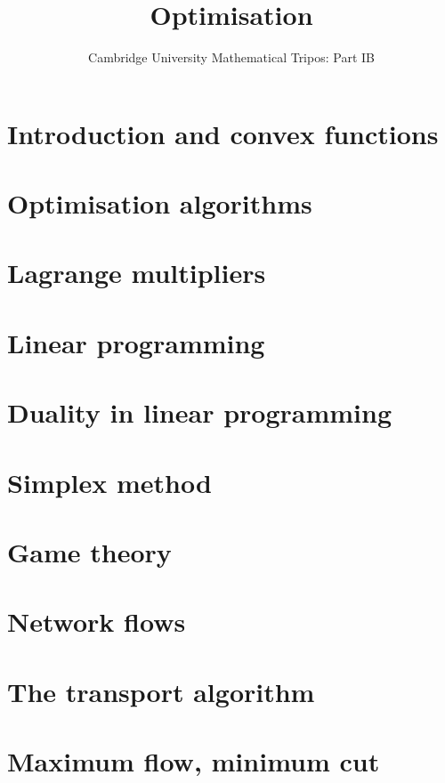 \documentclass{article}
\title{Optimisation}
\author{Cambridge University Mathematical Tripos: Part IB}
\begin{document}
\maketitle

\tableofcontentsnewpage{}

\section{Introduction and convex functions}

\section{Optimisation algorithms}

\section{Lagrange multipliers}

\section{Linear programming}

\section{Duality in linear programming}

\section{Simplex method}

\section{Game theory}

\section{Network flows}

\section{The transport algorithm}

\section{Maximum flow, minimum cut}

\end{document}
